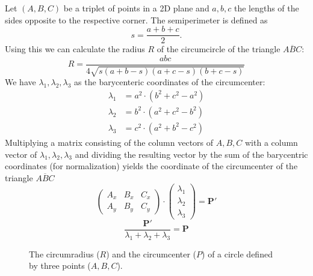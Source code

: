 \documentclass[11pt]{scrreprt}
\begin{document}
Let $(A,B,C)$ be a triplet of points in a 2D plane and $a,b,c$ the lengths of the sides opposite to the respective corner.
%
The semiperimeter is defined as
%
\begin{equation}
  s = \frac{a+b+c}{2}.
\end{equation}
%
Using this we can calculate the radius $R$ of the circumcircle of the triangle $\overline{ABC}$:
\begin{equation}
  R = \frac{abc}{4\sqrt{s(a+b-s)(a+c-s)(b+c-s)}}
\end{equation}
We have $\lambda_1, \lambda_2, \lambda_3$ as the barycenteric coordinates of the circumcenter:
\begin{align}
  \lambda_1 &= a^2\cdot(b^2+c^2-a^2)\\
  \lambda_2 &= b^2\cdot(a^2+c^2-b^2)\\
  \lambda_3 &= c^2\cdot(a^2+b^2-c^2)
\end{align}
Multiplying a matrix consisting of the column vectors of $A,B,C$ with a column vector of $\lambda_1, \lambda_2, \lambda_3$ and dividing the resulting vector by the sum of the barycentric coordinates (for normalization) yields the coordinate of the circumcenter of the triangle $\overline{ABC}$ 
%
\begin{equation}
  \begin{pmatrix}
    A_x & B_x & C_x \\
    A_y & B_y & C_y
  \end{pmatrix} \cdot \begin{pmatrix}
    \lambda_1\\
    \lambda_2\\
    \lambda_3
  \end{pmatrix} = \boldsymbol{P'}
\end{equation}
%
\begin{equation}
  \frac{\boldsymbol{P'}}{\lambda_1+\lambda_2+\lambda_3} = \boldsymbol{P}
\end{equation}
%
\begin{figure}[tb]
\centering
{}
\caption{The circumradius ($R$) and the circumcenter ($P$) of a circle defined by three points ($A,B,C$).}
\label{fig:circum_fig}
\end{figure}
\end{document}
